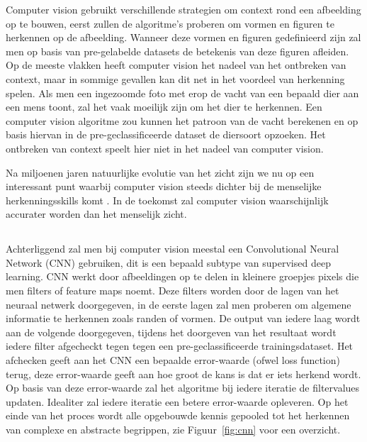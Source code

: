 Computer vision gebruikt verschillende strategien om context rond een afbeelding op te bouwen, eerst zullen de algoritme's proberen om vormen en figuren te herkennen op de afbeelding. Wanneer deze vormen en figuren gedefinieerd zijn zal men op basis van pre-gelabelde datasets de betekenis van deze figuren afleiden. Op de meeste vlakken heeft computer vision het nadeel van het ontbreken van context, maar in sommige gevallen kan dit net in het voordeel van herkenning spelen. Als men een ingezoomde foto met erop de vacht van een bepaald dier aan een mens toont, zal het vaak moeilijk zijn om het dier te herkennen. Een computer vision algoritme zou kunnen het patroon van de vacht berekenen en op basis hiervan in de pre-geclassificeerde dataset de diersoort opzoeken. Het ontbreken van context speelt hier niet in het nadeel van computer vision.

Na miljoenen jaren natuurlijke evolutie van het zicht zijn we nu op een interessant punt waarbij computer vision steeds dichter bij de menselijke herkenningsskills komt \autocite{Scheirer2014}. In de toekomst zal computer vision waarschijnlijk accurater worden dan het menselijk zicht.

\subsection{}
\label{sec:convolutional-neural-network}
Achterliggend zal men bij computer vision meestal een Convolutional Neural Network (CNN) gebruiken, dit is een bepaald subtype van supervised deep learning. CNN werkt door afbeeldingen op te delen in kleinere groepjes pixels die men filters of feature maps noemt. Deze filters worden door de lagen van het neuraal netwerk doorgegeven, in de eerste lagen zal men proberen om algemene informatie te herkennen zoals randen of vormen. De output van iedere laag wordt aan de volgende doorgegeven, tijdens het doorgeven van het resultaat wordt iedere filter afgecheckt tegen tegen een pre-geclassificeerde trainingsdataset. Het afchecken geeft aan het CNN een bepaalde error-waarde (ofwel loss function) terug, deze error-waarde geeft aan hoe groot de kans is dat er iets herkend wordt. Op basis van deze error-waarde zal het algoritme bij iedere iteratie de filtervalues updaten. Idealiter zal iedere iteratie een betere error-waarde opleveren. Op het einde van het proces wordt alle opgebouwde kennis gepooled tot het herkennen van complexe en abstracte begrippen, zie Figuur~\ref{fig:cnn} voor een overzicht.

